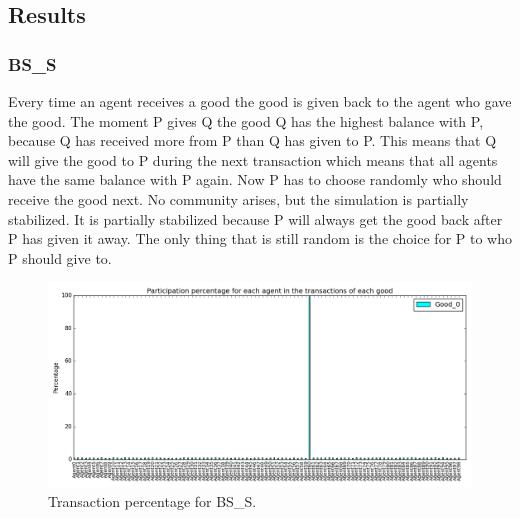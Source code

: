 \documentclass[twoside,openright]{uva-bachelor-thesis}
\begin{document}
\subsection{Results}

\subsubsection{BS\_S}
Every time an agent receives a good the good is given back to the agent who gave the good. The moment P gives Q the good Q has the highest balance with P, because Q has received more from P than Q has given to P. This means that Q will give the good to P during the next transaction which means that all agents have the same balance with P again. Now P has to choose randomly who should receive the good next. No community arises, but the simulation is partially stabilized. It is partially stabilized because P will always get the good back after P has given it away. The only thing that is still random is the choice for P to who P should give to. \\
\begin{figure}[h!]
  \centering
   \includegraphics[scale=0.4]{Simulation_figures/BR_BS_S/Figure1_10k}
\caption{Transaction percentage for BS\_S.}
\end{figure}
\end{document}
